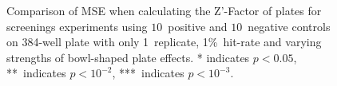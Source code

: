 \begin{figure}[!htb]
  
  \caption{Comparison of MSE when calculating the Z'-Factor of plates for
    screenings experiments using $10$~positive and $10$~negative
    controls on 384-well plate with only 1~replicate, 1\%~hit-rate and
    varying strengths of bowl-shaped plate effects. * indicates
    ${p<0.05}$, **~indicates ${p<10^{-2}}$, ***~indicates
    ${p<10^{-3}}$.}
  \label{fig:screening-zpscore-collection-10-10-stdev-3} 
\end{figure}





